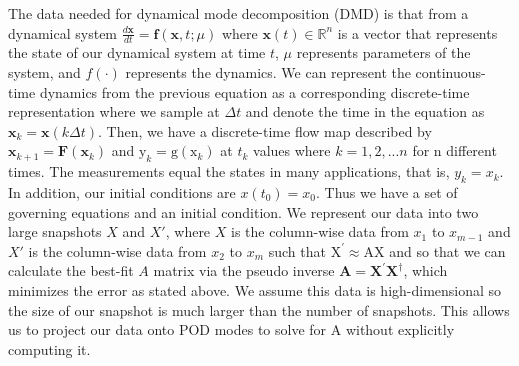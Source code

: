 \documentclass{article}
\begin{document}
	The data needed for dynamical mode decomposition (DMD) is that from a dynamical system $\frac{d \mathbf{x}}{d t}=\mathbf{f}(\mathbf{x}, t ; \mu)$ where $\mathbf{x}(t) \in \mathbb{R}^{n}$ is a vector that represents the state of our dynamical system at time $t$, $\mu$ represents parameters of the system, and $f(\cdot)$ represents the dynamics. We can represent the continuous-time dynamics from the previous equation as a corresponding discrete-time representation where we sample at $\Delta t$ and denote the time in the equation as  $\mathbf{x}_{k}=\mathbf{x}(k \Delta t)$. Then, we have a discrete-time flow map described by $\mathbf{x}_{k+1}=\mathbf{F}\left(\mathbf{x}_{k}\right)$ and $\mathrm{y}_{k}=\mathrm{g}\left(\mathrm{x}_{k}\right)$ at $t_k$ values where  $k = 1,2,...n$ for n different times. The measurements equal the states in many applications, that is, $y_k = x_k$. In addition, our initial conditions are $x(t_0) = x_0$. Thus we have a set of governing equations and an initial condition. We represent our data into two large snapshots $X$ and $X'$, where $X$ is the column-wise data from $x_1$ to $x_{m-1}$ and $X'$ is the column-wise data from $x_2$ to $x_m$ such that $\mathrm{X}^{\prime} \approx \mathrm{AX}$ and so that we can calculate the best-fit $A$ matrix via the pseudo inverse  $\mathbf{A}=\mathbf{X}^{\prime} \mathbf{X}^{\dagger}$, which minimizes the error as stated above. We assume this data is high-dimensional so the size of our snapshot is much larger than the number of snapshots. This allows us to project our data onto POD modes to solve for A without explicitly computing it.\\ \\
\end{document}

